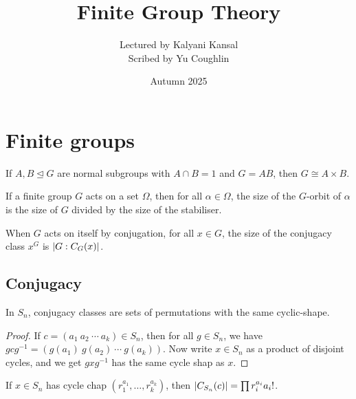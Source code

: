 \documentclass{article}
\begin{document}
\title{Finite Group Theory}
\author{Lectured by Kalyani Kansal \\
Scribed by Yu Coughlin}
\date{Autumn 2025}

\maketitle

\tableofcontents

\section{Finite groups}

\begin{proposition}
    If $A,B\unlhd G$ are normal subgroups with $A\cap B = 1$ and $G=AB$, then $G\cong A\times B$.
\end{proposition}

\begin{proposition}
    If a finite group $G$ acts on a set $\Omega$, then for all $\alpha \in \Omega$, the size of the $G$-orbit of $\alpha$ is the size of $G$ divided by the size of the stabiliser.
\end{proposition}

\begin{corollary}
    When $G$ acts on itself by conjugation, for all $x\in G$, the size of the conjugacy class $x^G$ is $\left| G:C_G(x) \right|$.
\end{corollary}

\subsection{Conjugacy}

\begin{proposition}
    In $S_n$, conjugacy classes are sets of permutations with the same cyclic-shape.
    \begin{proof}
        If $c = (a_1\ a_2 \ \cdots \ a_k)\in S_n$, then for all $g\in S_n$, we have $gcg^{-1} = (g(a_1) \ g(a_2) \ \cdots \ g(a_k))$. Now write $x\in S_n$ as a product of disjoint cycles, and we get $gxg^{-1}$ has the same cycle shap as $x$.
    \end{proof}
\end{proposition}

\begin{corollary}
    If $x\in S_n$ has cycle chap $(r_1^{a_1},\ldots,r_k^{a_k})$, then $\left| C_{S_n}(c) \right| = \prod r_i^{a_i}a_i!$.
\end{corollary}
\end{document}

